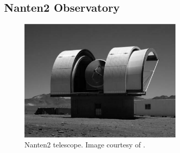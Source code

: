 \subsection{Nanten2 Observatory} \label{sec:NANTEN}

\begin{figure} [b!]
    \centering
    \includegraphics[width=0.7\textwidth]{06_Interstellar_Medium/Images/Observatories/Nanten2.pdf}
    \caption{Nanten2 telescope. Image courtesy of \cite{2006IAUSS...1E..21F}.}
    \label{fig:interstellar_medium_NANTEN}
\end{figure}

